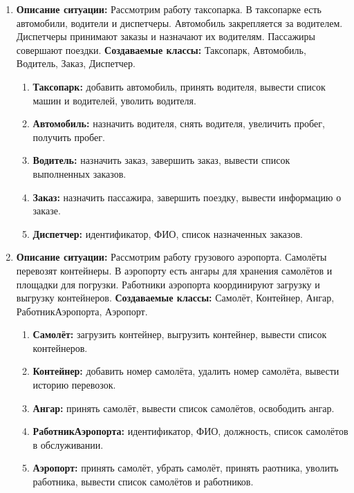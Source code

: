 \begin{enumerate}
\item
\textbf{Описание ситуации:}
Рассмотрим работу таксопарка. В таксопарке есть автомобили, 
водители и диспетчеры. Автомобиль закрепляется за водителем. 
Диспетчеры принимают заказы и назначают их водителям. Пассажиры совершают поездки.
\textbf{Создаваемые классы:} Таксопарк, Автомобиль, Водитель, Заказ, Диспетчер.
\begin{enumerate}
    \item \textbf{Таксопарк:} добавить автомобиль, принять водителя, вывести список машин и водителей, 
    уволить водителя.
    \item \textbf{Автомобиль:} назначить водителя, снять водителя, увеличить пробег, получить пробег.
    \item \textbf{Водитель:} назначить заказ, завершить заказ, 
    вывести список выполненных заказов.
    \item \textbf{Заказ:} назначить пассажира, завершить поездку, вывести информацию о заказе.
    \item \textbf{Диспетчер:} идентификатор, ФИО, список назначенных заказов.
\end{enumerate}

\item
\textbf{Описание ситуации:}
Рассмотрим работу грузового аэропорта. Самолёты перевозят контейнеры. 
В аэропорту есть ангары для хранения самолётов и площадки для погрузки. 
Работники аэропорта координируют загрузку и выгрузку контейнеров.
\textbf{Создаваемые классы:} Самолёт, Контейнер, Ангар, РаботникАэропорта, Аэропорт.
\begin{enumerate}
    \item \textbf{Самолёт:} загрузить контейнер, выгрузить контейнер, вывести список контейнеров.
    \item \textbf{Контейнер:} добавить номер самолёта, удалить номер самолёта, вывести историю перевозок.
    \item \textbf{Ангар:} принять самолёт, вывести список самолётов, освободить ангар.
    \item \textbf{РаботникАэропорта:} идентификатор, ФИО, должность, список самолётов в обслуживании.
    \item \textbf{Аэропорт:} принять самолёт, убрать самолёт, принять раотника, уволить работника, 
    вывести список самолётов и работников.
\end{enumerate}


\end{enumerate}
